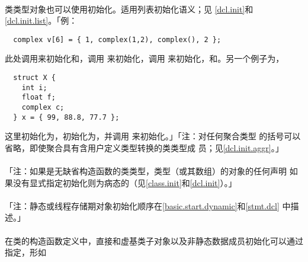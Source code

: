 \paragraph{}
类类型对象也可以使用初始化。适用列表初始化语义；见
\ref{dcl.init}和\ref{dcl.init.list}。「例：
\begin{lstlisting}
  complex v[6] = { 1, complex(1,2), complex(), 2 };
\end{lstlisting}
此处调用来初始化和，调用
来初始化，调用
来初始化，和。另一个例子为，
\begin{lstlisting}
  struct X {
    int i;
    float f;
    complex c;
  } x = { 99, 88.8, 77.7 };
\end{lstlisting}
这里初始化为，初始化为，并调用
来初始化。」「注：对任何聚合类型
的括号可以省略，即使聚合具有含用户定义类型转换的类类型成
员；见\ref{dcl.init.aggr}。」

\paragraph{}
「注：如果是无缺省构造函数的类类型，类型（或其数组）的对象的任何声明
如果没有显式指定初始化则为病态的（见\ref{class.init}和\ref{dcl.init}）。」

\paragraph{}
「注：静态或线程存储期对象初始化顺序在\ref{basic.start.dynamic}和\ref{stmt.dcl}
中描述。」

\paragraph{}
在类的构造函数定义中，直接和虚基类子对象以及非静态数据成员初始化可以通过
指定，形如


